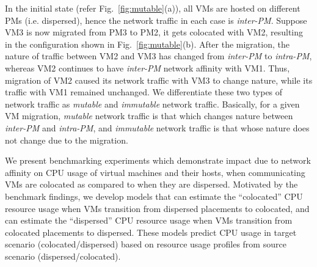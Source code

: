 In the initial state (refer Fig.~\ref{fig:mutable}(a)), all VMs are
hosted on different PMs (i.e. dispersed), hence the network traffic
in each case is \textit{inter-PM}. Suppose VM3 is now migrated from
PM3 to PM2, it gets colocated with VM2, resulting in the 
configuration shown in Fig.~\ref{fig:mutable}(b). 
After the migration, the nature of traffic between VM2 and VM3
has changed from \textit{inter-PM} to \textit{intra-PM}, whereas VM2
continues to have \textit{inter-PM} network affinity with VM1.
Thus, migration of VM2 caused its network traffic with VM3 to 
change nature, while its traffic with VM1 remained unchanged. We differentiate
these two types of network traffic as \textit{mutable} and \textit{immutable}
network traffic.
Basically, for a given VM migration, \textit{mutable} network traffic 
is that which changes nature between \textit{inter-PM} and \textit{intra-PM},
and \textit{immutable} network traffic is that whose nature does not change
due to the migration.

We present benchmarking experiments
which demonstrate impact due to network affinity
on CPU usage of virtual machines and their hosts, when communicating
VMs are colocated as compared to when they are dispersed. 
Motivated by the benchmark findings, we develop models
that can estimate the ``colocated'' CPU resource usage when VMs transition
from dispersed placements to colocated, and can estimate the ``dispersed''
CPU resource usage when VMs transition from colocated placements to dispersed. 
These models predict CPU usage in target
scenario (colocated/dispersed) based on resource usage profiles
from source scenario (dispersed/colocated).

